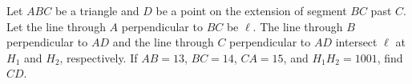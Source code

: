 Let $ABC$ be a triangle and $D$ be a point on the extension of segment $BC$ past $C$. Let the line through $A$ perpendicular to $BC$ be $\ell$. The line through $B$ perpendicular to $AD$ and the line through $C$ perpendicular to $AD$ intersect $\ell$ at $H_1$ and $H_2$, respectively. If $AB = 13$, $BC = 14$, $CA = 15$, and $H_1H_2 = 1001$, find $CD$.

